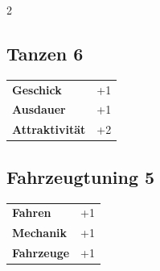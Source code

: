 \begin{multicols}{2}
\begin{tcolorbox}

\end{tcolorbox}

\begin{tcolorbox}
    \subsection*{Tanzen \hfill \small{6 }}
    \tcblower




\begin{tabular}{@{}ll@{}}
    \textbf{Geschick} & +1\\
    \textbf{Ausdauer} & +1\\
    \textbf{Attraktivität} & +2\\
\end{tabular}


\end{tcolorbox}

\begin{tcolorbox}
    \subsection*{Fahrzeugtuning \hfill \small{5 }}
    \tcblower




\begin{tabular}{@{}ll@{}}
    \textbf{Fahren} & +1\\
    \textbf{Mechanik} & +1\\
    \textbf{Fahrzeuge} & +1\\
\end{tabular}



\end{tcolorbox}
\end{multicols}
